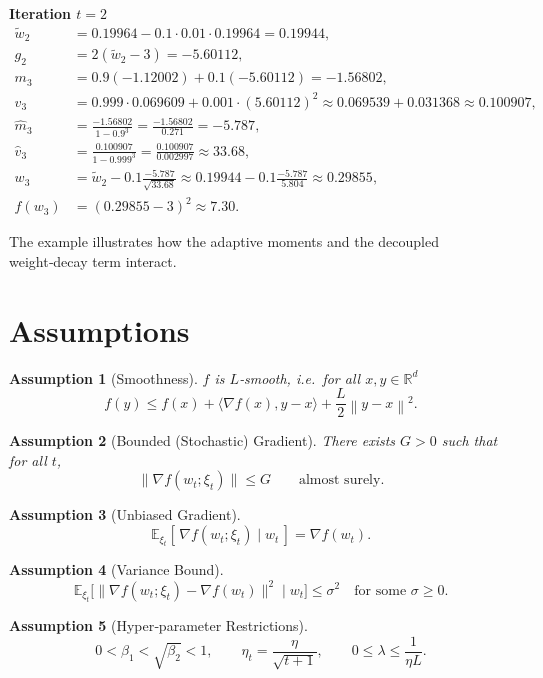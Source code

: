 \documentclass{article}
\newtheorem{assumption}{Assumption}
\newcommand{\E}{\mathbb{E}}
\newcommand{\R}{\mathbb{R}}
\newcommand{\norm}[1]{\left\lVert#1\right\rVert}
\begin{document}
\medskip
\noindent\textbf{Iteration $t=2$}
\[
\begin{aligned}
\tilde w_{2}&=0.19964-0.1\cdot0.01\cdot0.19964=0.19944,\\
g_{2}&=2(\tilde w_{2}-3)=-5.60112,\\
m_{3}&=0.9(-1.12002)+0.1(-5.60112)=-1.56802,\\
v_{3}&=0.999\cdot0.069609+0.001\cdot(5.60112)^{2}
      \approx0.069539+0.031368\approx0.100907,\\
\hat m_{3}&=\frac{-1.56802}{1-0.9^{3}}
           =\frac{-1.56802}{0.271}= -5.787,\\
\hat v_{3}&=\frac{0.100907}{1-0.999^{3}}
           =\frac{0.100907}{0.002997}\approx33.68,\\
w_{3}&= \tilde w_{2}
        -0.1\frac{-5.787}{\sqrt{33.68}}
        \approx0.19944-0.1\frac{-5.787}{5.804}
        \approx0.29855,\\
f(w_{3})&=(0.29855-3)^{2}\approx7.30 .
\end{aligned}
\]

The example illustrates how the adaptive moments and the decoupled weight‑decay term interact.

\newpage
\section*{Assumptions}
\begin{assumption}[Smoothness]\label{ass:smooth}
$f$ is $L$‑smooth, i.e.~for all $x,y\in\R^{d}$
\[
f(y)\le f(x)+\langle\nabla f(x),y-x\rangle+\frac{L}{2}\norm{y-x}^{2}.
\]
\end{assumption}
\begin{assumption}[Bounded (Stochastic) Gradient]\label{ass:bound}
There exists $G>0$ such that for all $t$,
\[
\|\nabla f(w_{t};\xi_{t})\|\le G\qquad\text{almost surely.}
\]
\end{assumption}
\begin{assumption}[Unbiased Gradient]\label{ass:unbiased}
\[
\E_{\xi_{t}}[\,\nabla f(w_{t};\xi_{t})\mid w_{t}\,]=\nabla f(w_{t}).
\]
\end{assumption}
\begin{assumption}[Variance Bound]\label{ass:var}
\[
\E_{\xi_{t}}\big[\|\nabla f(w_{t};\xi_{t})-\nabla f(w_{t})\|^{2}\mid w_{t}\big]
\le\sigma^{2}\quad\text{for some }\sigma\ge0 .
\]
\end{assumption}
\begin{assumption}[Hyper‑parameter Restrictions]\label{ass:hyper}
\[
0<\beta_{1}<\sqrt{\beta_{2}}<1,\qquad
\eta_{t}= \frac{\eta}{\sqrt{t+1}},\qquad
0\le\lambda\le\frac{1}{\eta L}.
\]
\end{assumption}
\end{document}
